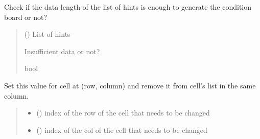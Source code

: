 \documentclass[letterpaper,10pt,english]{sphinxmanual}
\begin{document}
\begin{fulllineitems}
\begin{fulllineitems}
\label{\detokenize{condition_analysis:condition_analysis.CondBoard.checkMissingData}}
\pysigstartsignatures
{}
\pysigstopsignatures
\sphinxAtStartPar
Check if the data length of the list of hints is
enough to generate the condition board or not?
\begin{quote}\begin{description}
\sphinxAtStartPar
{} () \textendash{} List of hints

\sphinxAtStartPar
Insufficient data or not?

\sphinxAtStartPar
bool

\end{description}\end{quote}

\end{fulllineitems}


\begin{fulllineitems}
\label{\detokenize{condition_analysis:condition_analysis.CondBoard.setNdelValueCol}}
\pysigstartsignatures
{}
\pysigstopsignatures
\sphinxAtStartPar
Set this value for cell at (row, column)
and remove it from cell’s list in the same column.
\begin{quote}\begin{description}
\begin{itemize}
\item {} 
\sphinxAtStartPar
{} () \textendash{} index of the row of the cell that needs to be changed

\item {} 
\sphinxAtStartPar
{} () \textendash{} index of the col of the cell that needs to be changed


\end{itemize}
\end{description}
\end{quote}
\end{fulllineitems}
\end{fulllineitems}
\end{document}
